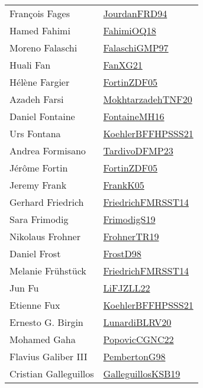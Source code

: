 {\begin{longtable}{p{4cm}p{20cm}}
Fran{\c{c}}ois Fages & \href{}{JourdanFRD94}\cite{JourdanFRD94} \\
Hamed Fahimi & \href{articles/FahimiOQ18.pdf}{FahimiOQ18}\cite{FahimiOQ18} \\
Moreno Falaschi & \href{articles/FalaschiGMP97.pdf}{FalaschiGMP97}\cite{FalaschiGMP97} \\
Huali Fan & \href{articles/FanXG21.pdf}{FanXG21}\cite{FanXG21} \\
H{\'{e}}l{\`{e}}ne Fargier & \href{papers/FortinZDF05.pdf}{FortinZDF05}\cite{FortinZDF05} \\
Azadeh Farsi & \href{}{MokhtarzadehTNF20}\cite{MokhtarzadehTNF20} \\
Daniel Fontaine & \href{papers/FontaineMH16.pdf}{FontaineMH16}\cite{FontaineMH16} \\
Urs Fontana & \href{articles/KoehlerBFFHPSSS21.pdf}{KoehlerBFFHPSSS21}\cite{KoehlerBFFHPSSS21} \\
Andrea Formisano & \href{papers/TardivoDFMP23.pdf}{TardivoDFMP23}\cite{TardivoDFMP23} \\
J{\'{e}}r{\^{o}}me Fortin & \href{papers/FortinZDF05.pdf}{FortinZDF05}\cite{FortinZDF05} \\
Jeremy Frank & \href{papers/FrankK05.pdf}{FrankK05}\cite{FrankK05} \\
Gerhard Friedrich & \href{}{FriedrichFMRSST14}\cite{FriedrichFMRSST14} \\
Sara Frimodig & \href{papers/FrimodigS19.pdf}{FrimodigS19}\cite{FrimodigS19} \\
Nikolaus Frohner & \href{papers/FrohnerTR19.pdf}{FrohnerTR19}\cite{FrohnerTR19} \\
Daniel Frost & \href{papers/FrostD98.pdf}{FrostD98}\cite{FrostD98} \\
Melanie Fr{\"{u}}hst{\"{u}}ck & \href{}{FriedrichFMRSST14}\cite{FriedrichFMRSST14} \\
Jun Fu & \href{papers/LiFJZLL22.pdf}{LiFJZLL22}\cite{LiFJZLL22} \\
Etienne Fux & \href{articles/KoehlerBFFHPSSS21.pdf}{KoehlerBFFHPSSS21}\cite{KoehlerBFFHPSSS21} \\
Ernesto G. Birgin & \href{articles/LunardiBLRV20.pdf}{LunardiBLRV20}\cite{LunardiBLRV20} \\
Mohamed Gaha & \href{papers/PopovicCGNC22.pdf}{PopovicCGNC22}\cite{PopovicCGNC22} \\
Flavius Galiber III & \href{papers/PembertonG98.pdf}{PembertonG98}\cite{PembertonG98} \\
Cristian Galleguillos & \href{papers/GalleguillosKSB19.pdf}{GalleguillosKSB19}\cite{GalleguillosKSB19} \\

\end{longtable}}
